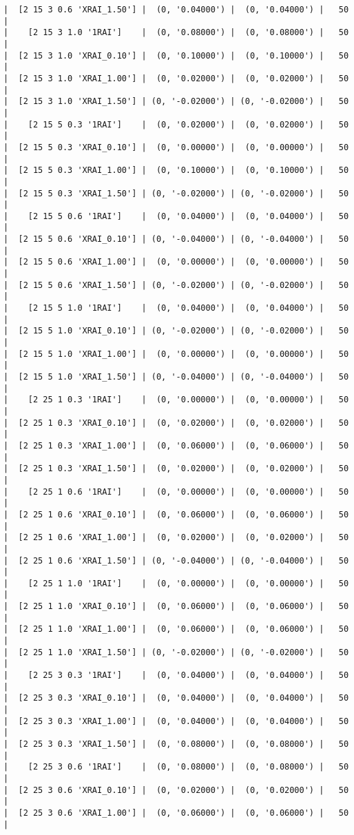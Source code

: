 \documentclass{article}
\begin{document}
\begin{verbatim}
|  [2 15 3 0.6 'XRAI_1.50'] |  (0, '0.04000') |  (0, '0.04000') |   50  |
|    [2 15 3 1.0 '1RAI']    |  (0, '0.08000') |  (0, '0.08000') |   50  |
|  [2 15 3 1.0 'XRAI_0.10'] |  (0, '0.10000') |  (0, '0.10000') |   50  |
|  [2 15 3 1.0 'XRAI_1.00'] |  (0, '0.02000') |  (0, '0.02000') |   50  |
|  [2 15 3 1.0 'XRAI_1.50'] | (0, '-0.02000') | (0, '-0.02000') |   50  |
|    [2 15 5 0.3 '1RAI']    |  (0, '0.02000') |  (0, '0.02000') |   50  |
|  [2 15 5 0.3 'XRAI_0.10'] |  (0, '0.00000') |  (0, '0.00000') |   50  |
|  [2 15 5 0.3 'XRAI_1.00'] |  (0, '0.10000') |  (0, '0.10000') |   50  |
|  [2 15 5 0.3 'XRAI_1.50'] | (0, '-0.02000') | (0, '-0.02000') |   50  |
|    [2 15 5 0.6 '1RAI']    |  (0, '0.04000') |  (0, '0.04000') |   50  |
|  [2 15 5 0.6 'XRAI_0.10'] | (0, '-0.04000') | (0, '-0.04000') |   50  |
|  [2 15 5 0.6 'XRAI_1.00'] |  (0, '0.00000') |  (0, '0.00000') |   50  |
|  [2 15 5 0.6 'XRAI_1.50'] | (0, '-0.02000') | (0, '-0.02000') |   50  |
|    [2 15 5 1.0 '1RAI']    |  (0, '0.04000') |  (0, '0.04000') |   50  |
|  [2 15 5 1.0 'XRAI_0.10'] | (0, '-0.02000') | (0, '-0.02000') |   50  |
|  [2 15 5 1.0 'XRAI_1.00'] |  (0, '0.00000') |  (0, '0.00000') |   50  |
|  [2 15 5 1.0 'XRAI_1.50'] | (0, '-0.04000') | (0, '-0.04000') |   50  |
|    [2 25 1 0.3 '1RAI']    |  (0, '0.00000') |  (0, '0.00000') |   50  |
|  [2 25 1 0.3 'XRAI_0.10'] |  (0, '0.02000') |  (0, '0.02000') |   50  |
|  [2 25 1 0.3 'XRAI_1.00'] |  (0, '0.06000') |  (0, '0.06000') |   50  |
|  [2 25 1 0.3 'XRAI_1.50'] |  (0, '0.02000') |  (0, '0.02000') |   50  |
|    [2 25 1 0.6 '1RAI']    |  (0, '0.00000') |  (0, '0.00000') |   50  |
|  [2 25 1 0.6 'XRAI_0.10'] |  (0, '0.06000') |  (0, '0.06000') |   50  |
|  [2 25 1 0.6 'XRAI_1.00'] |  (0, '0.02000') |  (0, '0.02000') |   50  |
|  [2 25 1 0.6 'XRAI_1.50'] | (0, '-0.04000') | (0, '-0.04000') |   50  |
|    [2 25 1 1.0 '1RAI']    |  (0, '0.00000') |  (0, '0.00000') |   50  |
|  [2 25 1 1.0 'XRAI_0.10'] |  (0, '0.06000') |  (0, '0.06000') |   50  |
|  [2 25 1 1.0 'XRAI_1.00'] |  (0, '0.06000') |  (0, '0.06000') |   50  |
|  [2 25 1 1.0 'XRAI_1.50'] | (0, '-0.02000') | (0, '-0.02000') |   50  |
|    [2 25 3 0.3 '1RAI']    |  (0, '0.04000') |  (0, '0.04000') |   50  |
|  [2 25 3 0.3 'XRAI_0.10'] |  (0, '0.04000') |  (0, '0.04000') |   50  |
|  [2 25 3 0.3 'XRAI_1.00'] |  (0, '0.04000') |  (0, '0.04000') |   50  |
|  [2 25 3 0.3 'XRAI_1.50'] |  (0, '0.08000') |  (0, '0.08000') |   50  |
|    [2 25 3 0.6 '1RAI']    |  (0, '0.08000') |  (0, '0.08000') |   50  |
|  [2 25 3 0.6 'XRAI_0.10'] |  (0, '0.02000') |  (0, '0.02000') |   50  |
|  [2 25 3 0.6 'XRAI_1.00'] |  (0, '0.06000') |  (0, '0.06000') |   50  |

\end{verbatim}
\end{document}
